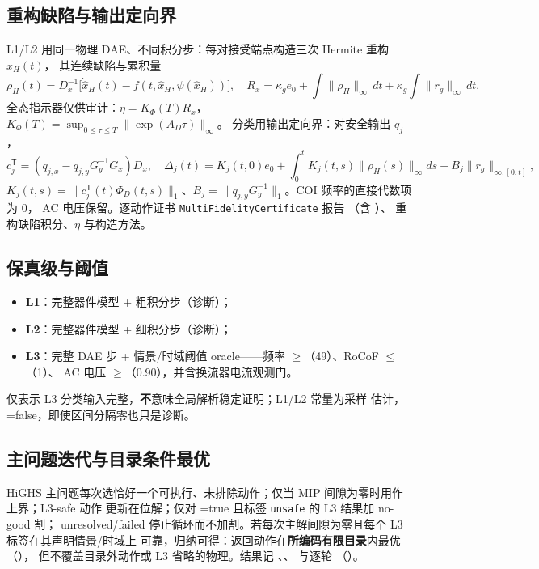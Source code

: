 \subsection{重构缺陷与输出定向界}
L1/L2 用同一物理 DAE、不同积分步：每对接受端点构造三次 Hermite 重构 $\widehat x_H(t)$，
其连续缺陷与累积量
\begin{equation}
\rho_H(t)=D_x^{-1}\big[\dot{\widehat x}_H(t)-f(t,\widehat x_H,\psi(\widehat x_H))\big],\quad
R_x=\kappa_g e_0+\int\|\rho_H\|_\infty\,dt+\kappa_g\int\|r_g\|_\infty\,dt.
\end{equation}
全态指示器仅供审计：$\eta=K_\Phi(T)R_x$，$K_\Phi(T)=\sup_{0\le\tau\le T}\|\exp(A_D\tau)\|_\infty$。
分类用输出定向界：对安全输出 $q_j$，
\begin{equation}
c_j^\mathsf{T}=(q_{j,x}-q_{j,y}G_y^{-1}G_x)D_x,\quad
\Delta_j(t)=K_j(t,0)e_0+\int_0^tK_j(t,s)\|\rho_H(s)\|_\infty ds+B_j\|r_g\|_{\infty,[0,t]},
\end{equation}
$K_j(t,s)=\|c_j^\mathsf{T}(t)\Phi_D(t,s)\|_1$、$B_j=\|q_{j,y}G_y^{-1}\|_1$。COI 频率的直接代数项为 0，
AC 电压保留。逐动作证书
\texttt{MultiFidelity\allowbreak Certificate} 报告 （含 ）、
重构缺陷积分、$\eta$ 与构造方法。

\subsection{保真级与阈值}
\begin{itemize}
  \item \textbf{L1}：完整器件模型 + 粗积分步（诊断）；
  \item \textbf{L2}：完整器件模型 + 细积分步（诊断）；
  \item \textbf{L3}：完整 DAE 步 + 情景/时域阈值 oracle——频率
        $\ge$（49）、RoCoF $\le$（1）、
        AC 电压 $\ge$（0.90），并含换流器电流观测门。
\end{itemize}
 仅表示 L3 分类输入完整，\textbf{不}意味全局解析稳定证明；L1/L2 常量为采样
估计，=false，即使区间分隔零也只是诊断。

\subsection{主问题迭代与目录条件最优}
HiGHS 主问题每次选恰好一个可执行、未排除动作；仅当 MIP 间隙为零时用作上界；L3-safe 动作
更新在位解；仅对 =true 且标签 \texttt{unsafe} 的 L3 结果加 no-good 割；
unresolved/failed 停止循环而不加割。若每次主解间隙为零且每个 L3 标签在其声明情景/时域上
可靠，归纳可得：返回动作在\textbf{所编码有限目录}内最优（），
但不覆盖目录外动作或 L3 省略的物理。结果记 、、
 与逐轮 （）。
